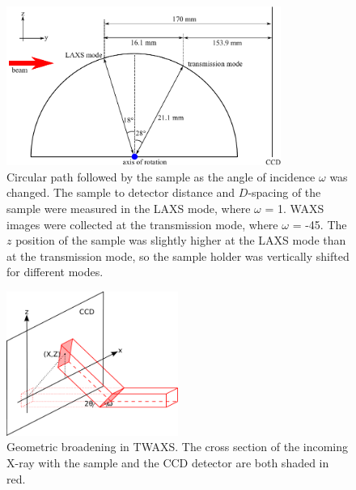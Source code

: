\begin{figure}[htbp]
  \centering
  \includegraphics[width=0.8\textwidth]{figures/ripple/MMs/transmission/sgeometry}
  \caption{Circular path followed by the sample 
  as the angle of incidence $\omega$ was changed. The sample to detector distance and 
  $D$-spacing of the sample were measured in the LAXS mode, where $\omega$ = 1\textdegree. WAXS images
  were collected at the transmission mode, where $\omega$ = -45\textdegree. 
  The $z$ position of the sample was
  slightly higher at the LAXS mode than at the transmission mode, so the 
  sample holder was vertically shifted for different modes.}
  \label{fig:sgeometry}
\end{figure}



\begin{figure}[htbp]
  \centering
  \includegraphics[width=0.5\textwidth]{figures/ripple/MMs/transmission/geometric_broadening1}
  \caption{Geometric broadening in TWAXS. The cross section of the incoming X-ray 
  with the sample and the CCD detector are both shaded in red.}
  \label{fig:gb_trans1}
\end{figure}

